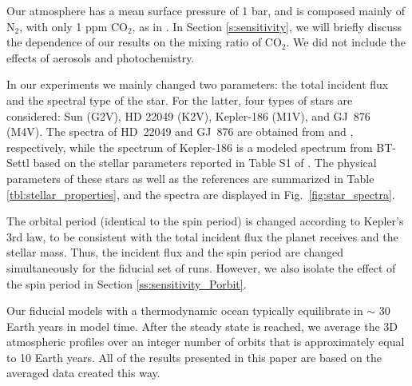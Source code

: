 \documentclass[11pt,numberedappendix,twocolappendix,]{emulateapj}
\begin{document}
Our atmosphere has a mean surface pressure of 1 bar, and is composed mainly of N$_2$, with only 1 ppm CO$_2$, as in \citet{Kopparapu2016}. 
In Section \ref{s:sensitivity}, we will briefly discuss the dependence of our results on the mixing ratio of CO$_2$. 
We did not include the effects of aerosols and photochemistry. 


In our experiments we mainly changed two parameters: the total incident flux and the spectral type of the star. 
For the latter, four types of stars are considered: 
Sun (G2V), 
HD 22049 (K2V), 
Kepler-186 (M1V), and 
GJ~876 (M4V). 
The spectra of HD~22049 and GJ~876 are obtained from \citet{Segura2003} and \citet{Domagal-Goldman2014}, respectively, 
while the spectrum of Kepler-186 is a modeled spectrum from BT-Settl \citep{Allard2012} based on the stellar parameters reported in Table S1 of \citet{Quintana2014}. 
The physical parameters of these stars as well as the references are summarized in Table \ref{tbl:stellar_properties}, and the spectra are displayed in Fig.~\ref{fig:star_spectra}. 

The orbital period (identical to the spin period) is changed according to Kepler's 3rd law, to be consistent with the total incident flux the planet receives and the stellar mass. Thus, the incident flux and the spin period are changed simultaneously for the fiducial set of runs. 
However, we also isolate the effect of the spin period in Section \ref{ss:sensitivity_Porbit}. 

Our fiducial models with a thermodynamic ocean typically equilibrate in $\sim $ 30 Earth years in model time. 
After the steady state is reached, we average the 3D atmospheric profiles over an integer number of orbits that is approximately equal to 10 Earth years. 
All of the results presented in this paper are based on the averaged data created this way. 
\end{document}

